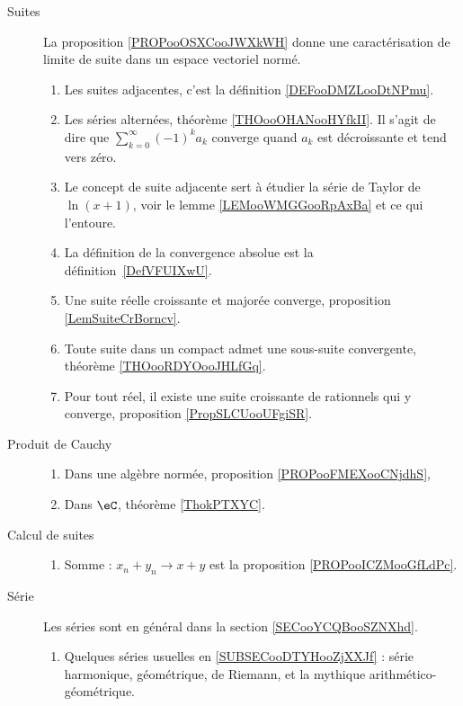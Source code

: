 
\begin{description}
	\item[Suites]
		La proposition \ref{PROPooOSXCooJWXkWH} donne une caractérisation de limite de suite dans un espace vectoriel normé.
		\begin{enumerate}
			\item
			      Les suites adjacentes, c'est la définition \ref{DEFooDMZLooDtNPmu}.
			\item
			      Les séries alternées, théorème \ref{THOooOHANooHYfkII}. Il s'agit de dire que \( \sum_{k=0}^{\infty}(-1)^ka_k\) converge quand \( a_k\) est décroissante et tend vers zéro.
			\item
			      Le concept de suite adjacente sert à étudier la série de Taylor de \( \ln(x+1)\), voir le lemme \ref{LEMooWMGGooRpAxBa} et ce qui l'entoure.
			\item
			      La définition de la convergence absolue est la définition~\ref{DefVFUIXwU}.
			\item
			      Une suite réelle croissante et majorée converge, proposition \ref{LemSuiteCrBorncv}.
			\item
			      Toute suite dans un compact admet une sous-suite convergente, théorème \ref{THOooRDYOooJHLfGq}.
			\item
			      Pour tout réel, il existe une suite croissante de rationnels qui y converge, proposition \ref{PropSLCUooUFgiSR}.
		\end{enumerate}
	\item[Produit de Cauchy]
		\begin{enumerate}
			\item
			      Dans une algèbre normée, proposition \ref{PROPooFMEXooCNjdhS},
			\item
			      Dans \( \eC\), théorème \ref{ThokPTXYC}.
		\end{enumerate}
	\item[Calcul de suites]
		\begin{enumerate}
			\item
			      Somme : \( x_n+y_n\to x+y\) est la proposition \ref{PROPooICZMooGfLdPc}.
		\end{enumerate}
	\item[Série]
		Les séries sont en général dans la section \ref{SECooYCQBooSZNXhd}.
		\begin{enumerate}
			\item
			      Quelques séries usuelles en \ref{SUBSECooDTYHooZjXXJf} : série harmonique, géométrique, de Riemann, et la mythique arithmético-géométrique.

\end{enumerate}
\end{description}
